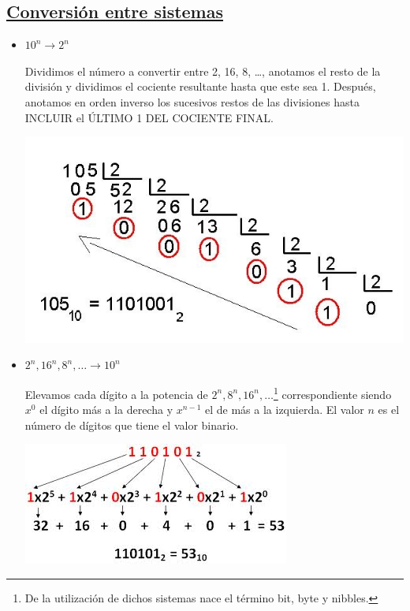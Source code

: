 \documentclass[a4paper,10pt]{book}
\begin{document}
\subsection*{\underline{Conversión entre sistemas}}
\begin{itemize}
\item $10^n\rightarrow 2^n$\par
Dividimos el número a convertir entre 2, 16, 8, …, anotamos el resto de la división y dividimos el cociente resultante hasta que este sea 1. Después, anotamos en orden inverso los sucesivos restos de las divisiones hasta INCLUIR el ÚLTIMO 1 DEL COCIENTE FINAL.
 
\begin{center}
\includegraphics[scale=0.25]{decimal a binario}
\end{center}
 
\item $2^n,16^n,8^n,…\rightarrow 10^n$\par
Elevamos cada dígito a la potencia de $2^n,8^n,16^n,…$\footnote{De la utilización de dichos sistemas nace el término bit, byte y nibbles.} correspondiente siendo $x^0$ el dígito más a la derecha y $x^{n-1}$ el de más a la izquierda. El valor $n$ es el número de dígitos que tiene el valor binario.

\begin{center}
\includegraphics[scale=0.5]{pasar de binario a decimal}
\end{center}


\end{itemize}
\end{document}
